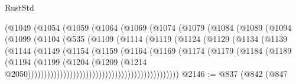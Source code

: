 \begin{lexlean}{RustStd}
\begin{coremodule}
                            (@1049
                              (@1054
                                (@1059
                                  (@1064
                                    (@1069
                                      (@1074
                                        (@1079
                                          (@1084
                                            (@1089
                                              (@1094
                                                (@1099
                                                  (@1104
                                                    (@535
                                                      (@1109
                                                        (@1114
                                                          (@1119
                                                            (@1124
                                                              (@1129
                                                                (@1134
                                                                  (@1139
                                                                    (@1144
                                                                      (@1149
                                                                        (@1154
                                                                          (@1159
                                                                            (@1164
                                                                              (@1169
                                                                                (@1174
                                                                                  (@1179
                                                                                    (@1184
                                                                                      (@1189
                                                                                        (@1194
                                                                                          (@1199
                                                                                            (@1204
                                                                                              (@1209
                                                                                                (@1214
                                                                                                  @2050)))))))))))))))))))))))))))))))))))))))))))))))
@2146 := @837
    (@842
      (@847

\end{coremodule}
\end{lexlean}

